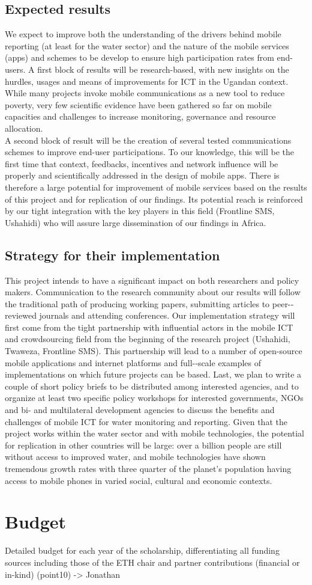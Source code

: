 \documentclass[11pt]{article}
\begin{document}
\subsection{Expected results}
We expect to improve both the understanding of the drivers behind mobile reporting (at least for the water sector) and the nature of the mobile services (apps) and schemes to be develop to ensure high participation rates from end-users. A first block of results will be research-based, with new insights on the hurdles, usages and means of improvements for ICT in the Ugandan context. While many projects invoke mobile communications as a new tool to reduce poverty, very few scientific evidence have been gathered so far on mobile capacities and challenges to increase monitoring, governance and resource allocation. 
\\
A second block of result will be the creation of several tested communications schemes to improve end-user participations. To our knowledge, this will be the first time that context, feedbacks, incentives and network influence will be properly and scientifically addressed in the design of mobile apps. There is therefore a large potential for improvement of mobile services based on the results of this project and for replication of our findings. Its potential reach is reinforced by our tight integration with the key players in this field (Frontline SMS, Ushahidi) who will assure large dissemination of our findings in Africa.
\subsection{Strategy for their implementation}
This project intends to have a significant impact on both researchers and policy makers. Communication to the research community about our results will follow the traditional path of producing working papers, submitting articles to peer-­reviewed journals and attending conferences. Our implementation strategy will first come from the tight partnership with influential actors in the mobile ICT and crowdsourcing field from the beginning of the research project (Ushahidi, Twaweza, Frontline SMS). This partnership will lead to a number of open-­source mobile applications and internet platforms and full-­‐scale examples of implementations on which future projects can be based. Last, we plan to write a couple of short policy briefs to be distributed among interested agencies, and to organize at least two specific policy workshops for interested governments, NGOs and bi-­ and multilateral development agencies to discuss the benefits and challenges of mobile ICT for water monitoring and reporting. Given that the 
project works within the water sector and with mobile technologies, the potential for replication in other countries will be large: over a billion people are still without access to improved water, and mobile technologies have shown tremendous growth rates with three quarter of the planet’s population having access to mobile phones in varied social, cultural and economic contexts.

\section{Budget}

Detailed budget for each year of the scholarship, differentiating all funding sources including those of the ETH chair and partner contributions (financial or in-kind) (point10) -> Jonathan




\end{document}
